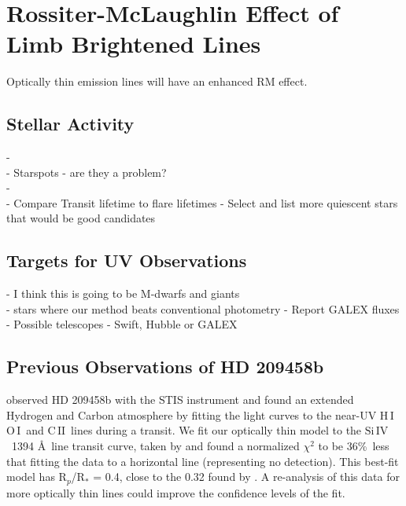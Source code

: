 \documentclass[twocolumn]{emulateapj}
\newcommand{\cii}{\ensuremath{\mathrm{C}\,\scriptstyle \mathrm{II}}}
\newcommand{\oi}{\ensuremath{\mathrm{O}\,\scriptstyle \mathrm{I}}}
\newcommand{\hi}{\ensuremath{\mathrm{H}\,\scriptstyle \mathrm{I}}}
\newcommand{\siIV}{\ensuremath{\mathrm{Si}\,\scriptstyle \mathrm{IV}}}
\begin{document}
\section{Rossiter-McLaughlin Effect of Limb Brightened Lines}

Optically thin emission lines will have an enhanced RM effect.

\subsection{Stellar Activity} \label{labl:stactv}
-\\
-    Starspots - are they a problem? \\
-\\
-    Compare Transit lifetime to flare lifetimes
-  Select and list more quiescent stars that would be good candidates


\subsection{Targets for UV Observations} \label{labl:targ}
- I think this is going to be M-dwarfs and giants \\
- stars where our method beats conventional photometry
-      Report GALEX fluxes \\
-   Possible telescopes - Swift, Hubble or GALEX \\

\subsection{Previous Observations of HD 209458b}

\citet{viddisc} observed HD 209458b with the STIS instrument and found
an extended Hydrogen and Carbon atmosphere by fitting the light curves
to the near-UV \hi\, \oi\ and \cii\ lines during a transit. We fit our optically thin model to
the \siIV\ 1394 \AA\ line transit curve, taken by \citet{vidmad} and
found a normalized $\chi^2$ to be 36\%\ less that fitting the data to
a horizontal line (representing no detection). This best-fit model has
R$_p$/R$_*$ = 0.4, close to the 0.32 found by \citet{vidmad}. A
re-analysis of this data for more optically thin lines could improve
the confidence levels of the fit.
\end{document}
